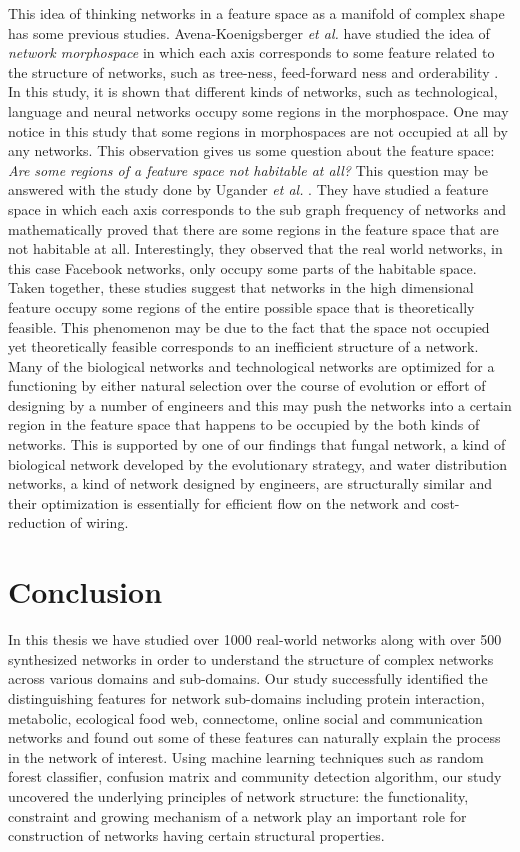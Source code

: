 \documentclass{article}
\begin{document}
This idea of thinking networks in a feature space as a manifold of complex shape has some previous studies. Avena-Koenigsberger \textit{et al.} have studied the idea of \textit{network morphospace} in which each axis corresponds to some feature related to the structure of networks, such as tree-ness, feed-forward ness and orderability \cite{NetworkMorphospace}. In this study, it is shown that different kinds of networks, such as technological, language and neural networks occupy some regions in the morphospace. One may notice in this study that some regions in morphospaces are not occupied at all by any networks. This observation gives us some question about the feature space: \textit{Are some regions of a feature space not habitable at all?} This question may be answered with the study done by Ugander \textit{et al.} \cite{Ugander:2013}. They have studied a feature space in which each axis corresponds to the sub graph frequency of networks and mathematically proved that there are some regions in the feature space that are not habitable at all. Interestingly, they observed that the real world networks, in this case Facebook networks, only occupy some parts of the habitable space. Taken together, these studies suggest that networks in the high dimensional feature occupy some regions of the entire possible space that is theoretically feasible. This phenomenon may be due to the fact that the space not occupied yet theoretically feasible corresponds to an inefficient structure of a network. Many of the biological networks and technological networks are optimized for a functioning by either natural selection over the course of evolution or effort of designing by a number of engineers and this may push the networks into a certain region in the feature space that happens to be occupied by the both kinds of networks. This is supported by one of our findings that fungal network, a kind of biological network developed by the evolutionary strategy, and water distribution networks, a kind of network designed by engineers, are structurally similar and their optimization is essentially for efficient flow on the network and cost-reduction of wiring.
 
 \section{Conclusion}
 In this thesis we have studied over 1000 real-world networks along with over 500 synthesized networks in order to understand the structure of complex networks across various domains and sub-domains. Our study successfully identified the distinguishing features for network sub-domains including protein interaction, metabolic, ecological food web, connectome, online social and communication networks and found out some of these features can naturally explain the process in the network of interest. Using machine learning techniques such as random forest classifier, confusion matrix and community detection algorithm, our study uncovered the underlying principles of network structure: the functionality, constraint and growing mechanism of a network play an important role for construction of networks having certain structural properties.
  
\end{document}
